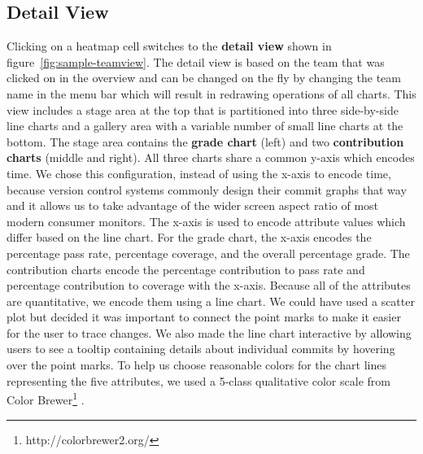 \documentclass[../manifest.tex]{subfiles}
\begin{document}
\subsection{Detail View}

Clicking on a heatmap cell switches to the \textbf{detail view} shown in figure~\ref{fig:sample-teamview}. The detail view is based on the team that was clicked on in the overview and can be changed on the fly by changing the team name in the menu bar which will result in redrawing operations of all charts. This view includes a stage area at the top that is partitioned into three side-by-side line charts and a gallery area with a variable number of small line charts at the bottom. The stage area contains the \textbf{grade chart} (left) and two \textbf{contribution charts} (middle and right). All three charts share a common y-axis which encodes time. We chose this configuration, instead of using the x-axis to encode time, because version control systems commonly design their commit graphs that way and it allows us to take advantage of the wider screen aspect ratio of most modern consumer monitors. The x-axis is used to encode attribute values which differ based on the line chart. For the grade chart, the x-axis encodes the percentage pass rate, percentage coverage, and the overall percentage grade. The contribution charts encode the percentage contribution to pass rate and percentage contribution to coverage with the x-axis. Because all of the attributes are quantitative, we encode them using a line chart. We could have used a scatter plot but decided it was important to connect the point marks to make it easier for the user to trace changes. We also made the line chart interactive by allowing users to see a tooltip containing details about individual commits by hovering over the point marks. To help us choose reasonable colors for the chart lines representing the five attributes, we used a 5-class qualitative color scale from Color Brewer\footnote{http://colorbrewer2.org/} \cite{colorbrewer}.
\end{document}
